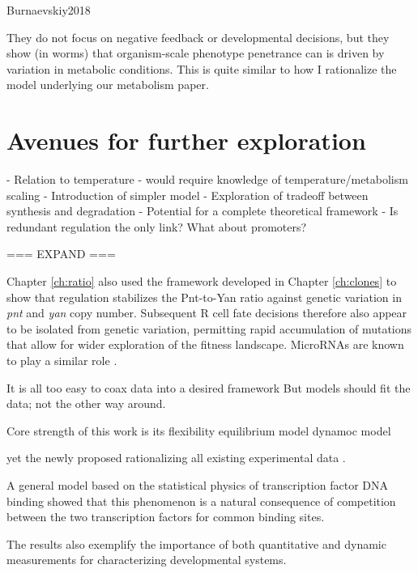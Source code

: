 Burnaevskiy2018

They do not focus on negative feedback or developmental decisions, but they show (in worms) that organism-scale phenotype penetrance can is driven by variation in metabolic conditions. This is quite similar to how I rationalize the model underlying our metabolism paper.






\section{ Avenues for further exploration }

- Relation to temperature - would require knowledge of temperature/metabolism scaling
- Introduction of simpler model
- Exploration of tradeoff between synthesis and degradation
- Potential for a complete theoretical framework
- Is redundant regulation the only link? What about promoters?






=== EXPAND ===


Chapter \ref{ch:ratio} also used the framework developed in Chapter \ref{ch:clones} to show that regulation stabilizes the Pnt-to-Yan ratio against genetic variation in \textit{pnt} and \textit{yan} copy number. Subsequent R cell fate decisions therefore also appear to be isolated from genetic variation, permitting rapid accumulation of mutations that allow for wider exploration of the fitness landscape. MicroRNAs are known to play a similar role \cite{Cassidy2013,Cassidy2016}.



It is all too easy to coax data into a desired framework
But models should fit the data; not the other way around. 

Core strength of this work is its flexibility
equilibrium model
dynamoc model

yet the newly proposed rationalizing all existing experimental data \cite{Shwartz2013,BoisclairLachance2014,Pelaez2015a}.

A general model based on the statistical physics of transcription factor DNA binding showed that this phenomenon is a natural consequence of competition between the two transcription factors for common binding sites. 

The results also exemplify the importance of both quantitative and dynamic measurements for characterizing developmental systems. 








